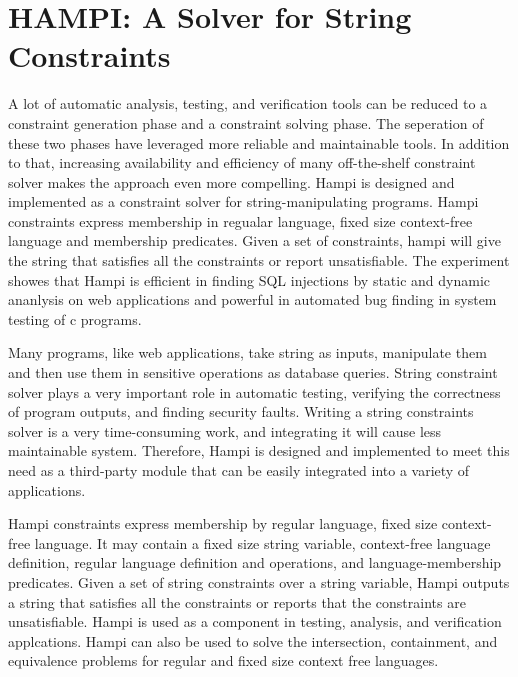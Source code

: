 \section{HAMPI: A Solver for String Constraints}
A lot of automatic analysis, testing, and verification tools can be reduced to a constraint generation phase and a constraint solving phase. The seperation of these two phases have leveraged more reliable and maintainable tools. In addition to that, increasing availability and efficiency of many off-the-shelf constraint solver makes the approach even more compelling. Hampi \cite{hampi} is designed and implemented as a constraint solver for string-manipulating programs. Hampi constraints express membership in regualar language, fixed size context-free language and membership predicates. Given a set of constraints, hampi will give the string that satisfies all the constraints or report unsatisfiable. The experiment showes that Hampi is efficient in finding SQL injections by static and dynamic ananlysis on web applications and powerful in automated bug finding in system testing of c programs.
 
Many programs, like web applications, take string as inputs, manipulate them and then use them in sensitive operations as database queries. String constraint solver plays a very important role in automatic testing\cite{pathfeasibility, database, fuzzing}, verifying the correctness of program outputs\cite{stringanalysis}, and finding security faults\cite{injection, webapp}. Writing a string constraints solver is a very time-consuming work, and integrating it will cause less maintainable system. Therefore, Hampi is designed and implemented to meet this need as a third-party module that can be easily integrated into a variety of applications.     

Hampi constraints express membership by regular language, fixed size context-free language. It may contain a fixed size string variable, context-free language definition, regular language definition and operations, and language-membership predicates. Given a set of string constraints over a string variable, Hampi outputs a string that satisfies all the constraints or reports that the constraints are unsatisfiable. Hampi is used as a component in testing, analysis, and verification applcations. Hampi can also be used to solve the intersection, containment, and equivalence problems for regular and fixed size context free languages.

